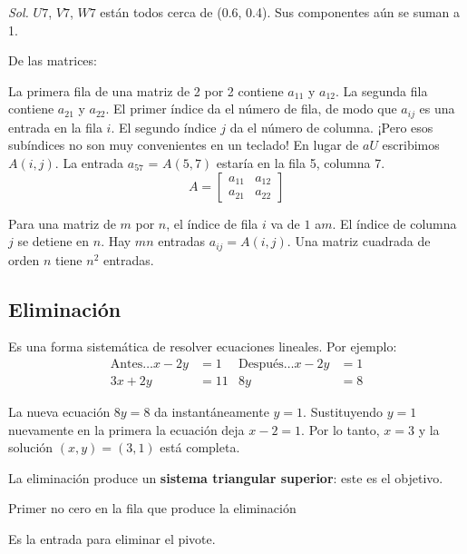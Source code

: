 \textit{ Sol. }
$U7$, $V7$, $W7$ están todos cerca de (0.6, 0.4). Sus componentes aún se suman a 1.

\begin{notation}
	De las matrices:

	La primera fila de una matriz de 2 por 2 contiene $a_{11}$ y $a_{12}$. La segunda fila contiene $a_{21}$ y
	$a_{22}$. El primer índice da el número de fila, de modo que $a_{ij}$ es una entrada en la fila $i$. El segundo índice
	$j$ da el número de columna. ¡Pero esos subíndices no son muy convenientes en un teclado!
	En lugar de $aU$ escribimos$A (i, j)$. La entrada $a_{57}$ = $A (5, 7)$ estaría en la fila 5, columna 7.
	\begin{equation}
		A= \begin{bmatrix}
			a_{11} & a_{12} \\
			a_{21} & a_{22}
		\end{bmatrix}
	\end{equation}
\end{notation}


Para una matriz de $m$ por $n$, el índice de fila $i$ va de $1$ a$ m$. El índice de columna $j$ se detiene en $n$.
Hay $mn$ entradas $a_{ij} = A (i, j)$. Una matriz cuadrada de orden $n$ tiene $n^2 $ entradas.

\subsection{Eliminación}
Es una forma sistemática de resolver ecuaciones lineales. Por ejemplo:
\begin{align*}
	\text{Antes$\ldots$} x-2y & =1   & \text{Después$\ldots$} x-2y & =1 \\
	3x + 2y                   & = 11 & 8y                          & =8
\end{align*}

La nueva ecuación $8y=8$ da instantáneamente $y = 1$. Sustituyendo $y = 1$ nuevamente en la primera
la ecuación deja $x-2 = 1$. Por lo tanto, $x = 3$ y la solución $(x, y) = (3, 1)$ está completa.

La eliminación produce un \textbf{sistema triangular superior}: este es el objetivo.

\begin{definition}[Pivote]
	Primer no cero en la fila que produce la eliminación
\end{definition}

\begin{definition}[Multiplicador]
	Es la entrada para eliminar el pivote.
\end{definition}

